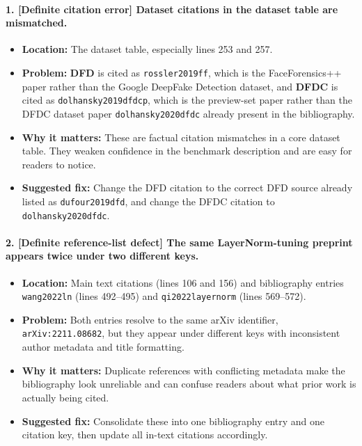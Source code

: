 \documentclass[11pt]{article}
\begin{document}
\paragraph{1. [Definite citation error] Dataset citations in the dataset table are mismatched.}
\begin{itemize}
    \item \textbf{Location:} The dataset table, especially lines 253 and 257.
    \item \textbf{Problem:} \textbf{DFD} is cited as \texttt{rossler2019ff}, which is the FaceForensics++ paper rather than the Google DeepFake Detection dataset, and \textbf{DFDC} is cited as \texttt{dolhansky2019dfdcp}, which is the preview-set paper rather than the DFDC dataset paper \texttt{dolhansky2020dfdc} already present in the bibliography.
    \item \textbf{Why it matters:} These are factual citation mismatches in a core dataset table. They weaken confidence in the benchmark description and are easy for readers to notice.
    \item \textbf{Suggested fix:} Change the DFD citation to the correct DFD source already listed as \texttt{dufour2019dfd}, and change the DFDC citation to \texttt{dolhansky2020dfdc}.
\end{itemize}

\paragraph{2. [Definite reference-list defect] The same LayerNorm-tuning preprint appears twice under two different keys.}
\begin{itemize}
    \item \textbf{Location:} Main text citations (lines 106 and 156) and bibliography entries \texttt{wang2022ln} (lines 492--495) and \texttt{qi2022layernorm} (lines 569--572).
    \item \textbf{Problem:} Both entries resolve to the same arXiv identifier, \texttt{arXiv:2211.08682}, but they appear under different keys with inconsistent author metadata and title formatting.
    \item \textbf{Why it matters:} Duplicate references with conflicting metadata make the bibliography look unreliable and can confuse readers about what prior work is actually being cited.
    \item \textbf{Suggested fix:} Consolidate these into one bibliography entry and one citation key, then update all in-text citations accordingly.
\end{itemize}
\end{document}
